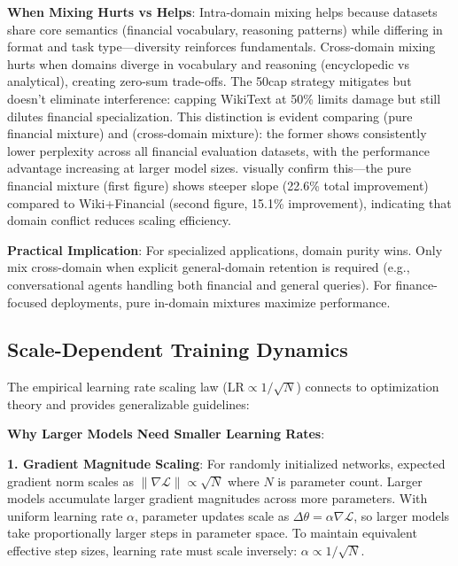 \textbf{When Mixing Hurts vs Helps}: Intra-domain mixing helps because datasets share core semantics (financial vocabulary, reasoning patterns) while differing in format and task type—diversity reinforces fundamentals. Cross-domain mixing hurts when domains diverge in vocabulary and reasoning (encyclopedic vs analytical), creating zero-sum trade-offs. The 50cap strategy mitigates but doesn't eliminate interference: capping WikiText at 50\% limits damage but still dilutes financial specialization. This distinction is evident comparing  (pure financial mixture) and  (cross-domain mixture): the former shows consistently lower perplexity across all financial evaluation datasets, with the performance advantage increasing at larger model sizes.  visually confirm this—the pure financial mixture (first figure) shows steeper slope (22.6\% total improvement) compared to Wiki+Financial (second figure, 15.1\% improvement), indicating that domain conflict reduces scaling efficiency.

\textbf{Practical Implication}: For specialized applications, domain purity wins. Only mix cross-domain when explicit general-domain retention is required (e.g., conversational agents handling both financial and general queries). For finance-focused deployments, pure in-domain mixtures maximize performance.

\subsection{Scale-Dependent Training Dynamics}

The empirical learning rate scaling law ($\text{LR} \propto 1/\sqrt{N}$) connects to optimization theory and provides generalizable guidelines:

\textbf{Why Larger Models Need Smaller Learning Rates}:

\textbf{1. Gradient Magnitude Scaling}: For randomly initialized networks, expected gradient norm scales as $\|\nabla\mathcal{L}\| \propto \sqrt{N}$ where $N$ is parameter count. Larger models accumulate larger gradient magnitudes across more parameters. With uniform learning rate $\alpha$, parameter updates scale as $\Delta\theta = \alpha \nabla\mathcal{L}$, so larger models take proportionally larger steps in parameter space. To maintain equivalent effective step sizes, learning rate must scale inversely: $\alpha \propto 1/\sqrt{N}$.


